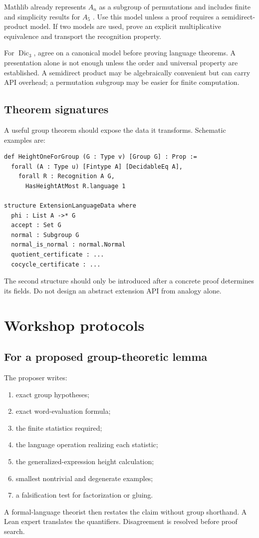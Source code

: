 \documentclass{amsart}
\begin{document}
Mathlib already represents $A_n$ as a subgroup of permutations and includes finite and simplicity results for $A_5$ \cite{mathlibAlternating2026}.  Use this model unless a proof requires a semidirect-product model.  If two models are used, prove an explicit multiplicative equivalence and transport the recognition property.

For $\operatorname{Dic}_3$, agree on a canonical model before proving language theorems.  A presentation alone is not enough unless the order and universal property are established.  A semidirect product may be algebraically convenient but can carry API overhead; a permutation subgroup may be easier for finite computation.

\subsection{Theorem signatures}

A useful group theorem should expose the data it transforms.  Schematic examples are:
\begin{lstlisting}[language={},caption={Lean-facing algebraic interfaces.}]
def HeightOneForGroup (G : Type v) [Group G] : Prop :=
  forall (A : Type u) [Fintype A] [DecidableEq A],
    forall R : Recognition A G,
      HasHeightAtMost R.language 1

structure ExtensionLanguageData where
  phi : List A ->* G
  accept : Set G
  normal : Subgroup G
  normal_is_normal : normal.Normal
  quotient_certificate : ...
  cocycle_certificate : ...
\end{lstlisting}
The second structure should only be introduced after a concrete proof determines its fields.  Do not design an abstract extension API from analogy alone.

\section{Workshop protocols}

\subsection{For a proposed group-theoretic lemma}

The proposer writes:
\begin{enumerate}
  \item exact group hypotheses;
  \item exact word-evaluation formula;
  \item the finite statistics required;
  \item the language operation realizing each statistic;
  \item the generalized-expression height calculation;
  \item smallest nontrivial and degenerate examples;
  \item a falsification test for factorization or gluing.
\end{enumerate}
A formal-language theorist then restates the claim without group shorthand.  A Lean expert translates the quantifiers.  Disagreement is resolved before proof search.
\end{document}
